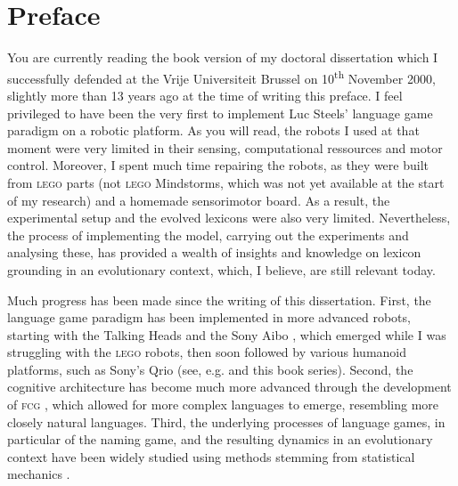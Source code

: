 \chapter*{Preface}

You are currently reading the book version of my doctoral dissertation which I successfully defended at the Vrije Universiteit Brussel on 10\textsuperscript{th} November 2000, slightly more than 13  years ago at the time of writing this preface. I feel privileged to have been the very first to implement Luc Steels' language game paradigm on a robotic platform. As you will read, the robots I used at that moment were very limited in their sensing, computational ressources and motor control. Moreover, I spent much time repairing the robots, as they were built from \textsc{lego} parts (not \textsc{lego} Mindstorms, which was not yet available at the start of my research) and a homemade sensorimotor board. As a result, the experimental setup and the evolved lexicons were also very limited. Nevertheless, the process of implementing the model, carrying out the experiments and analysing these, has provided a wealth of insights and knowledge on lexicon grounding in an evolutionary context, which, I believe, are still relevant today.

Much progress has been made since the writing of this dissertation. First, the language game paradigm has been implemented in more advanced robots, starting with the Talking Heads \citep{steelsetal:2002} and the Sony Aibo \citep{steelskaplan:2000}, which emerged while I was struggling with the \textsc{lego} robots, then soon followed by various humanoid platforms, such as Sony's Qrio (see, e.g. \citealt{steels:2012} and this book series). Second, the cognitive architecture has become much more advanced through the development of \textsc{fcg} \citep{steelsdebeule:2006}, which allowed for more complex languages to emerge, resembling more closely natural languages. Third, the underlying processes of language games, in particular of the naming game, and the resulting dynamics in an evolutionary context have been widely studied using methods stemming from statistical mechanics \citep[e.g., ][]{baronchellietal:2006a}.

